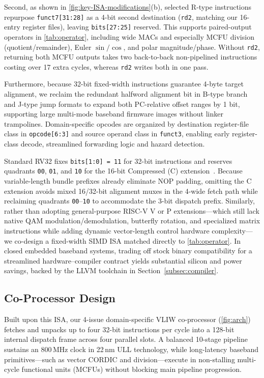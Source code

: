 \documentclass[9pt,conference]{IEEEtran}
\begin{document}
Second, as shown in \autoref{fig:key-ISA-modifications}(b), selected R-type instructions repurpose \texttt{funct7[31:28]} as a 4-bit second destination (\texttt{rd2}, matching our 16-entry register files), leaving \texttt{bits[27:25]} reserved. This supports paired-output operators in \autoref{tab:operator}, including wide MACs and especially MCFU division (quotient/remainder), Euler $\sin/\cos$, and polar magnitude/phase. Without \texttt{rd2}, returning both MCFU outputs takes two back-to-back non-pipelined instructions costing over 17 extra cycles, whereas \texttt{rd2} writes both in one pass.

Furthermore, because 32-bit fixed-width instructions guarantee 4-byte target alignment, we reclaim the redundant halfword alignment bit in B-type branch and J-type jump formats to expand both PC-relative offset ranges by 1 bit, supporting large multi-mode baseband firmware images without linker trampolines. Domain-specific opcodes are organized by destination register-file class in \texttt{opcode[6:3]} and source operand class in \texttt{funct3}, enabling early register-class decode, streamlined forwarding logic and hazard detection.

Standard RV32 fixes \texttt{bits[1:0] = 11} for 32-bit instructions and reserves quadrants \texttt{00}, \texttt{01}, and \texttt{10} for the 16-bit Compressed (C) extension~\cite{waterman2019risc}. Because variable-length bundle prefixes already eliminate NOP padding, omitting the C extension avoids mixed 16/32-bit alignment muxes in the 4-wide fetch path while reclaiming quadrants \texttt{00}--\texttt{10} to accommodate the 3-bit dispatch prefix. Similarly, rather than adopting general-purpose RISC-V V or P extensions---which still lack native QAM modulation/demodulation, butterfly rotation, and specialized matrix instructions while adding dynamic vector-length control hardware complexity---we co-design a fixed-width SIMD ISA matched directly to \autoref{tab:operator}. In closed embedded baseband systems, trading off stock binary compatibility for a streamlined hardware--compiler contract yields substantial silicon and power savings, backed by the LLVM toolchain in Section~\ref{subsec:compiler}.

\subsection{Co-Processor Design}
Built upon this ISA, our 4-issue domain-specific VLIW co-processor (\autoref{fig:arch}) fetches and unpacks up to four 32-bit instructions per cycle into a 128-bit internal dispatch frame across four parallel slots. A balanced 10-stage pipeline sustains an 800\,MHz clock in 22\,nm ULL technology, while long-latency baseband primitives---such as vector CORDIC and division---execute in non-stalling multi-cycle functional units (MCFUs) without blocking main pipeline progression.
\end{document}
